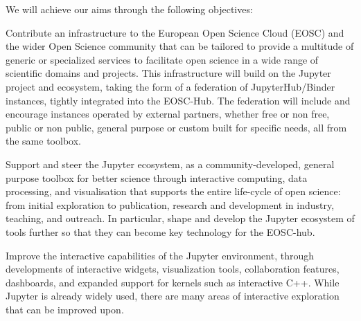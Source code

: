 

  

  
  

\noindent We will achieve our aims through the following objectives:

\begin{compactenum}

\item \label{obj:deployment} %
  Contribute an infrastructure to the European Open Science Cloud
  (EOSC) and the wider Open Science community that can be tailored to
  provide a multitude of generic or specialized services to facilitate
  open science in a wide range of scientific domains and projects.
  This infrastructure will build on the Jupyter project and ecosystem,
  taking the form of a federation of JupyterHub/Binder instances,
  tightly integrated into the EOSC-Hub.
  The federation will include and encourage instances operated by
  external partners, whether free or non free, public or non public,
  general purpose or custom built for specific needs, all from the
  same toolbox.

\item \label{obj:jupyter} %
  Support and steer the Jupyter ecosystem, as a community-developed,
  general purpose
  toolbox for better science through interactive computing, data
  processing, and
  visualisation that supports the entire life-cycle of open science:
  from initial exploration to publication, research and development in
  industry, teaching, and outreach. In particular, shape and develop
  the Jupyter ecosystem of tools further so that they can become key
  technology for the EOSC-hub.

\item \label{obj:interactivity} %
  Improve the interactive capabilities of the Jupyter environment,
  through developments of interactive widgets,
  visualization tools, collaboration features, dashboards,
  and expanded support for kernels such as interactive C++.
  While Jupyter is already widely used, there are many areas
  of interactive exploration that can be improved upon.


\end{compactenum}
